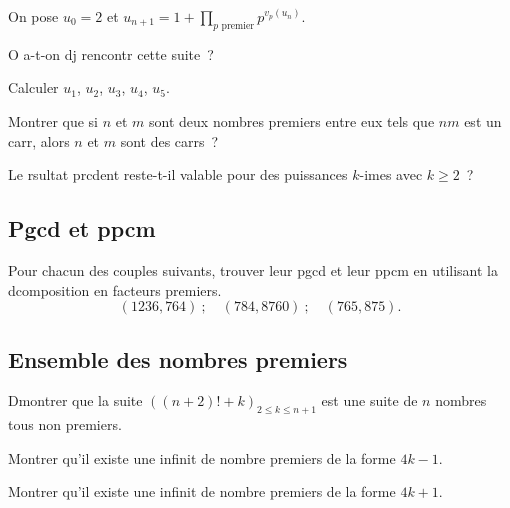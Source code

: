 \documentclass[a4paper,fleqn,openany]{trmbook}
\begin{document}
\begin{listeexercices}
\begin{exercice}
On pose $u_0 = 2$ et $u_{n+1} = 1 + \prod_{\text{$p$ premier}}{p^{v_p(u_n)}}$.
\begin{questions}
    \item O a-t-on dj rencontr cette suite~?
    \item Calculer $u_1$, $u_2$, $u_3$, $u_4$, $u_5$.
\end{questions}
\end{exercice}

\begin{exercice}
\begin{questions}
    \item Montrer que si $n$ et $m$ sont deux nombres premiers entre eux tels que $nm$ est un carr, alors $n$ et $m$ sont des carrs~?
    \item Le rsultat prcdent reste-t-il valable pour des puissances $k$-imes avec $k \geq 2$~?
\end{questions}
\end{exercice}

\subsection{Pgcd et ppcm}

\begin{exercice}
Pour chacun des couples suivants, trouver leur pgcd et leur ppcm en utilisant la dcomposition en facteurs premiers.
\[(1236,764)~; \quad (784,8760)~; \quad (765,875).\]
\end{exercice}

\subsection{Ensemble des nombres premiers}

\begin{exercice}
Dmontrer que la suite $((n+2)!+k)_{2 \leq k \leq n+1}$ est une suite de $n$ nombres tous non premiers.
\end{exercice}

\begin{exercice}
Montrer qu'il existe une infinit de nombre premiers de la forme $4k-1$.
\end{exercice}

\begin{exercice}
Montrer qu'il existe une infinit de nombre premiers de la forme $4k+1$.
\end{exercice}


\end{listeexercices}
\end{document}
